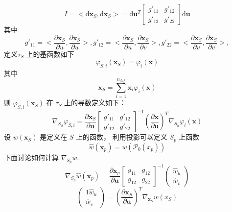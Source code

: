 \documentclass{article}
\begin{document}
\begin{equation*}
I = <\mathrm d \mathbf x_S, \mathrm d \mathbf x_S> = \mathrm d \mathbf u^T 
\begin{bmatrix}
g'_{11} & g'_{12}\\
g'_{12} & g'_{22}
\end{bmatrix}
\mathrm d \mathbf u
\end{equation*}
其中 
\begin{equation*}
g'_{11} =<\frac{\partial \mathbf x_S}{\partial u}, \frac{\partial \mathbf x_S}{\partial u}>, 
g'_{12} =<\frac{\partial \mathbf x_S}{\partial u}, \frac{\partial \mathbf x_S}{\partial v}>, 
g'_{22} =<\frac{\partial \mathbf x_S}{\partial v}, \frac{\partial \mathbf x_S}{\partial v}>, 
\end{equation*}
定义$\tau_S$ 上的基函数如下
\begin{equation*}
\varphi_{S,i}(\mathbf x_S) =\varphi_{i}(\mathbf x) 
\end{equation*}
其中
\begin{equation*}
\mathbf x_S = \sum_{i=1}^{n_{dof}} \mathbf x_i \varphi_{i}(\mathbf x) 
\end{equation*}
则 $\varphi_{S,i}(\mathbf x_S)$ 在 $\tau_S$ 上的导数定义如下：
\begin{equation*}
\nabla_{S_S} \varphi_{S,i} = \frac{\partial \mathbf x_S}{\partial \mathbf u}\begin{bmatrix}
g'_{11} & g'_{12}\\
g'_{12} & g'_{22}
\end{bmatrix}^{-1}(\frac{\partial \mathbf x}{\partial \mathbf u})^T\nabla_{S_h}\varphi_{i}(\mathbf x) 
\end{equation*}
设 $w(\mathbf x_S)$ 是定义在 $S$ 上的函数， 利用投影可以定义 $S_p$ 上函数 
\begin{equation*}
\hat w(\mathbf x_p) = w(\mathcal P_0(x_p))
\end{equation*}
下面讨论如何计算 $\nabla_{S_p} w$. 
\begin{equation*}
\nabla_{S_p} \hat w(\mathbf x_p) = \frac{\partial \mathbf x_p}{\partial \mathbf u}\begin{bmatrix}
g_{11} & g_{12}\\
g_{12} & g_{22}
\end{bmatrix}^{-1}
\begin{pmatrix}
\hat w_u \\ \hat w_v
\end{pmatrix}
\end{equation*}
\begin{equation*}
\begin{pmatrix}
1\hat w_u \\ \hat w_v
\end{pmatrix}
= (\frac{\partial \mathbf x_S}{\partial \mathbf u})^T \nabla_{\mathbf x_S} w(x_S)
\end{equation*}
\newpage
\end{document}
